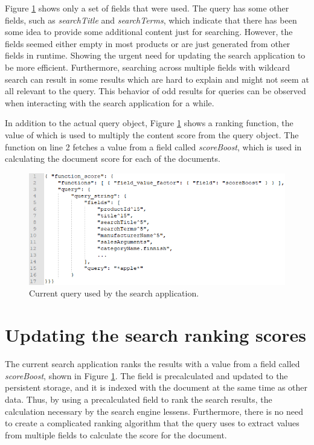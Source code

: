 Figure \ref{fig:current-query} shows only a set of fields that were used.
The query has some other fields, such as \emph{searchTitle}  and \emph{searchTerms}, which indicate
that there has been some idea to provide some additional content just for searching.
However, the fields seemed either empty in most products or are just generated from other fields in runtime.
Showing the urgent need for updating the search application to be more efficient.
Furthermore, searching across multiple fields with wildcard search can result in some results
which are hard to explain and might not seem at all relevant to the query.
This behavior of odd results for queries can be observed when interacting with the search application
for a while.

In addition to the actual query object, Figure \ref{fig:current-query} shows a ranking function, 
the value of which is used to multiply the content score from the query object. 
The function on line 2 fetches a value from a field called \emph{scoreBoost}, which is used in calculating 
the document score for each of the documents.


\begin{figure}
    \centering
    \includegraphics[width=\textwidth]{img/current-query.png}
    \caption{Current query used by the search application.}
    \label{fig:current-query}
\end{figure}


\section{Updating the search ranking scores}


The current search application ranks the results with a value from a field called \emph{scoreBoost},
shown in Figure \ref{fig:current-query}. 
The field is precalculated and updated to the persistent storage, and it
is indexed with the document at the same time as other data.
Thus, by using a precalculated field to rank the search results, the calculation necessary by the
search engine lessens.
Furthermore, there is no need to create a complicated ranking algorithm that the query uses
to extract values from multiple fields to calculate the score for the document.


